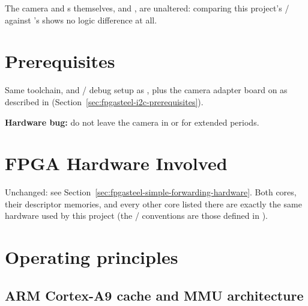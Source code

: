 The camera and  s themselves,  and , are unaltered: comparing this project's / against 's shows no logic difference at all.

\section{Prerequisites}
\label{sec:fpgasteel-cache-forwarding-prerequisites}

Same toolchain,  and / debug setup as , plus the  camera adapter board on  as described in  (Section~\ref{sec:fpgasteel-i2c-prerequisites}).

\begin{warningbox}
\textbf{Hardware bug:} do not leave the camera in  or  for extended periods.\footnotemark
\end{warningbox}

\section{FPGA Hardware Involved}
\label{sec:fpgasteel-cache-forwarding-hardware}

Unchanged: see Section~\ref{sec:fpgasteel-simple-forwarding-hardware}. Both  cores, their descriptor memories, and every other  core listed there are exactly the same hardware used by this project (the / conventions are those defined in \cite{AVALON-SPEC}).

\section{Operating principles}
\label{sec:fpgasteel-cache-forwarding-operating-principles}

\subsection{ARM Cortex-A9 cache and MMU architecture}
\label{subsec:fpgasteel-cache-mmu-architecture}


